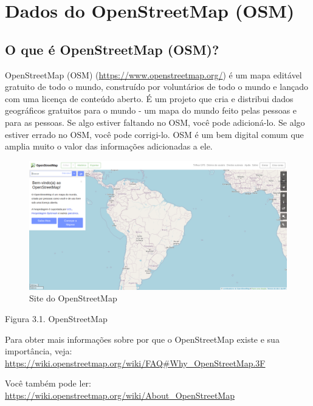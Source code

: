 \documentclass[
  portuguese,
]{krantz}
\begin{document}
\hypertarget{dados-do-openstreetmap-osm}{%
\section{Dados do OpenStreetMap (OSM)}\label{dados-do-openstreetmap-osm}}

\hypertarget{o-que-uxe9-openstreetmap-osm}{%
\subsection{\texorpdfstring{\textbf{O que é OpenStreetMap (OSM)?}}{O que é OpenStreetMap (OSM)?}}\label{o-que-uxe9-openstreetmap-osm}}

OpenStreetMap (OSM) (\url{https://www.openstreetmap.org/}) é um mapa editável gratuito de todo o mundo, construído por voluntários de todo o mundo e lançado com uma licença de conteúdo aberto. É um projeto que cria e distribui dados geográficos gratuitos para o mundo - um mapa do mundo feito pelas pessoas e para as pessoas. Se algo estiver faltando no OSM, você pode adicioná-lo. Se algo estiver errado no OSM, você pode corrigi-lo. OSM é um bem digital comum que amplia muito o valor das informações adicionadas a ele.

\begin{figure}
\centering
\includegraphics{media/modulo3/osm.png}
\caption{Site do OpenStreetMap}
\end{figure}

Figura 3.1. OpenStreetMap

Para obter mais informações sobre por que o OpenStreetMap existe e sua importância, veja: \href{https://wiki.openstreetmap.org/wiki/FAQ\#Why_OpenStreetMap\%20.3F}{https://wiki.openstreetmap.org/wiki/FAQ\#Why\_OpenStreetMap.3F}

Você também pode ler: \url{https://wiki.openstreetmap.org/wiki/About_OpenStreetMap}
\end{document}
